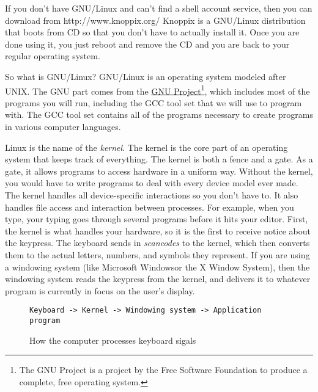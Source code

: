 If you don't have GNU/Linux
and can't find a shell account service, then you
can download  from http://www.knoppix.org/
Knoppix is a 
GNU/Linux distribution that boots from CD so that you don't have
to actually install it.  Once you are done using it, you just reboot and
remove the CD and you are back to your regular operating system.

So what is GNU/Linux?  GNU/Linux is an operating system modeled after
UNIX\textregistered.  The GNU part comes from the \url{GNU 
Project}\footnote{The GNU Project is a project by the Free
Software Foundation to produce a complete, free operating 
system.}, which includes most of the programs you 
will run, including
the GCC tool set that we 
will use to program with.  The GCC tool set
contains all of the programs necessary to create programs in various
computer languages.

Linux is the name
of the \emph{kernel}.  The kernel is the core part of an
operating system that keeps track of everything.  The kernel is
both a fence and a gate.  As a gate, it allows programs
to access hardware in a uniform way.  Without the kernel, you would have
to write programs to deal with every device model ever made.  The kernel
handles all device-specific interactions so you don't have to.  It also handles
file access and interaction between processes.  
For example, when you
type, your typing goes through several programs before it hits your editor.
First, the kernel is what handles your hardware, so it is the first to receive
notice about the keypress.  The keyboard sends in 
\emph{scancodes} to the kernel, which then converts them to the
actual letters, numbers, and symbols they represent.  If you are using a
windowing system (like Microsoft Windows\textregistered or the X Window System), then the
windowing system reads the keypress from the kernel, and delivers it to
whatever program is currently in focus on the user's display.

\begin{figure}

\begin{simpletyping}
\begin{lstlisting}
Keyboard -> Kernel -> Windowing system -> Application program
\end{lstlisting}
\end{simpletyping}

\caption{How the computer processes keyboard sigals}
\end{figure}

